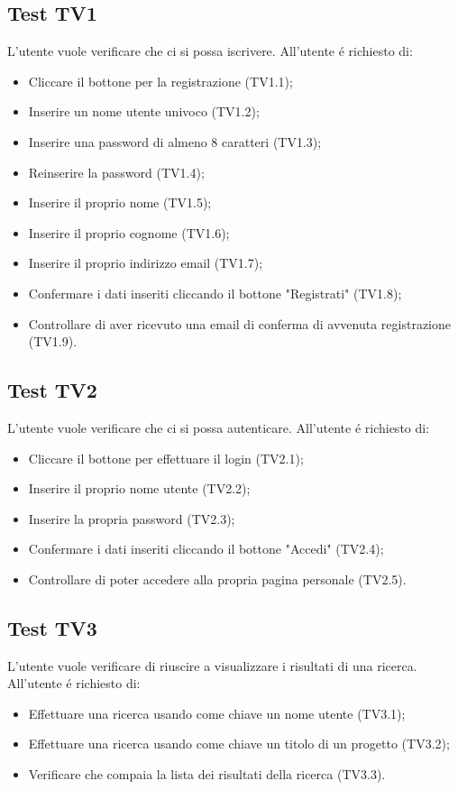 \subsection{Test TV1}
L'utente vuole verificare che ci si possa iscrivere. \newline
All'utente \'e richiesto di:
\begin{itemize}
	\item Cliccare il bottone per la registrazione (TV1.1);
	\item Inserire un nome utente univoco (TV1.2);
	\item Inserire una password di almeno 8 caratteri (TV1.3);
	\item Reinserire la password (TV1.4);
	\item Inserire il proprio nome (TV1.5);
	\item Inserire il proprio cognome (TV1.6);
	\item Inserire il proprio indirizzo email (TV1.7);
	\item Confermare i dati inseriti cliccando il bottone "Registrati" (TV1.8);
	\item Controllare di aver ricevuto una email di conferma di avvenuta registrazione (TV1.9).
\end{itemize}

\subsection{Test TV2}
L'utente vuole verificare che ci si possa autenticare. \newline
All'utente \'e richiesto di:
\begin{itemize}
	\item Cliccare il bottone per effettuare il login (TV2.1);
	\item Inserire il proprio nome utente (TV2.2);
	\item Inserire la propria password (TV2.3);
	\item Confermare i dati inseriti cliccando il bottone "Accedi" (TV2.4);
	\item Controllare di poter accedere alla propria pagina personale (TV2.5).
\end{itemize}

\subsection{Test TV3}
L'utente vuole verificare di riuscire a visualizzare i risultati di una ricerca. \newline
All'utente \'e richiesto di:
\begin{itemize}
	\item Effettuare una ricerca usando come chiave un nome utente (TV3.1);
	\item Effettuare una ricerca usando come chiave un titolo di un progetto (TV3.2);
	\item Verificare che compaia la lista dei risultati della ricerca (TV3.3).
\end{itemize}

